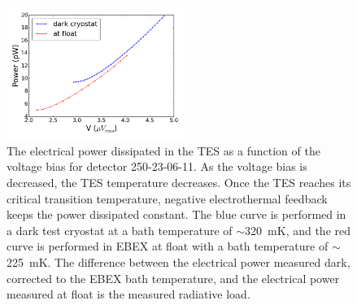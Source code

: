 \documentclass[../EBEXPaper2.tex]{subfiles}
\begin{document}

\begin{figure}[htbp]
\begin{center}
\includegraphics[height=1.7in]{images/board64_wire2_ch09_250-23-06-11_pv_curve}
\caption{The electrical power dissipated in the \ac{TES} as a function of the voltage bias for detector 250-23-06-11. As the voltage bias is decreased, the \ac{TES} temperature decreases. Once the \ac{TES} reaches its critical transition temperature, negative electrothermal feedback keeps the power dissipated constant. The blue curve is performed in a dark test cryostat at a bath temperature of $\sim$320~mK, and the red curve is performed in \ac{EBEX} at float with a bath temperature of $\sim$225~mK. The difference between the electrical power measured dark, corrected to the \ac{EBEX} bath temperature, and the electrical power measured at float is the measured radiative load.}
\label{fig:dark_light_pv}
\end{center}
\end{figure}
\end{document}
